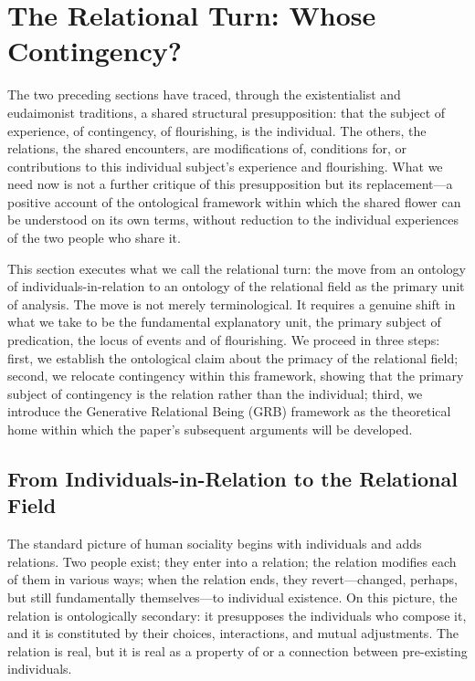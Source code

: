\section{The Relational Turn: Whose Contingency?}
\label{p14:sec:turn}

\noindent
The two preceding sections have traced, through the existentialist and eudaimonist traditions, a shared structural presupposition: that the subject of experience, of contingency, of flourishing, is the individual. The others, the relations, the shared encounters, are modifications of, conditions for, or contributions to this individual subject's experience and flourishing. What we need now is not a further critique of this presupposition but its replacement---a positive account of the ontological framework within which the shared flower can be understood on its own terms, without reduction to the individual experiences of the two people who share it.

This section executes what we call the relational turn: the move from an ontology of individuals-in-relation to an ontology of the relational field as the primary unit of analysis. The move is not merely terminological. It requires a genuine shift in what we take to be the fundamental explanatory unit, the primary subject of predication, the locus of events and of flourishing. We proceed in three steps: first, we establish the ontological claim about the primacy of the relational field; second, we relocate contingency within this framework, showing that the primary subject of contingency is the relation rather than the individual; third, we introduce the Generative Relational Being (GRB) framework as the theoretical home within which the paper's subsequent arguments will be developed.

\subsection{From Individuals-in-Relation to the Relational Field}
\label{p14:subsec:primacy}

\noindent
The standard picture of human sociality begins with individuals and adds relations. Two people exist; they enter into a relation; the relation modifies each of them in various ways; when the relation ends, they revert---changed, perhaps, but still fundamentally themselves---to individual existence. On this picture, the relation is ontologically secondary: it presupposes the individuals who compose it, and it is constituted by their choices, interactions, and mutual adjustments. The relation is real, but it is real as a property of or a connection between pre-existing individuals.

